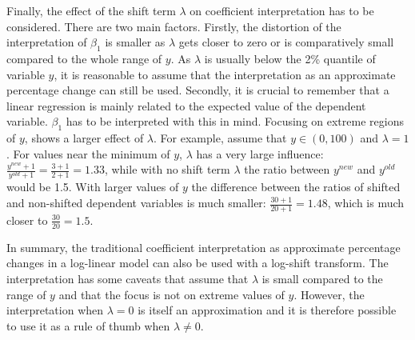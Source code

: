Finally, the effect of the shift term $\lambda$ on coefficient interpretation has to be considered.
There are two main factors.
Firstly, the distortion of the interpretation of $\beta_1$ is smaller as $\lambda$ gets closer to zero or is comparatively small compared to the whole range of $y$.
As $\lambda$ is usually below the 2\% quantile of variable $y$, it is reasonable to assume that the interpretation as an approximate percentage change can still be used.
Secondly, it is crucial to remember that a linear regression is mainly related to the expected value of the dependent variable.
$\beta_1$ has to be interpreted with this in mind.
Focusing on extreme regions of $y$, shows a larger effect of $\lambda$.
For example, assume that $y \in (0, 100)$ and $\lambda = 1$.
For values near the minimum of $y$, $\lambda$ has a very large influence: $\frac{y^{new} + 1 } {y^{old} + 1} = \frac{3 + 1}  {2 + 1} = 1.33$, while with no shift term $\lambda$ the ratio between $y^{new}$ and $y^{old}$ would be 1.5. With larger values of $y$ the difference between the ratios of shifted and non-shifted dependent variables is much smaller: $\frac{30 + 1}{20 + 1} = 1.48$, which is much closer to $\frac{30}{20} = 1.5$.

In summary, the traditional coefficient interpretation as approximate percentage changes in a log-linear model can also be used with a log-shift transform.
The interpretation has some caveats that assume that $\lambda$ is small compared to the range of $y$ and that the focus is not on extreme values of $y$.
However, the interpretation when $\lambda = 0$ is itself an approximation and it is therefore possible to use it as a rule of thumb when $\lambda \ne 0$.
